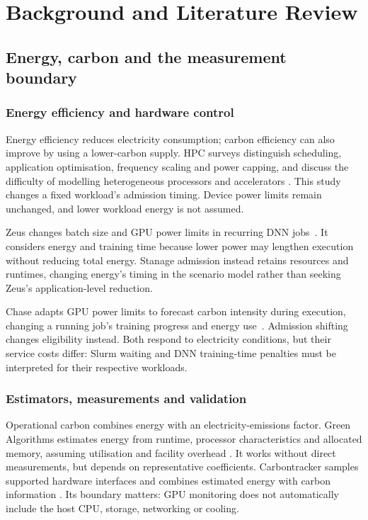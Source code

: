 \chapter{Background and Literature Review}
\label{ch:literature}

\section{Energy, carbon and the measurement boundary}

\subsection{Energy efficiency and hardware control}
Energy efficiency reduces electricity consumption; carbon efficiency can also improve by using a lower-carbon supply. HPC surveys distinguish scheduling, application optimisation, frequency scaling and power capping, and discuss the difficulty of modelling heterogeneous processors and accelerators \citep{czarnul2019energy,obrien2017survey}. This study changes a fixed workload's admission timing. Device power limits remain unchanged, and lower workload energy is not assumed.

Zeus changes batch size and GPU power limits in recurring DNN jobs~\citep{you2023zeus}. It considers energy and training time because lower power may lengthen execution without reducing total energy. Stanage admission instead retains resources and runtimes, changing energy's timing in the scenario model rather than seeking Zeus's application-level reduction.

Chase adapts GPU power limits to forecast carbon intensity during execution, changing a running job's training progress and energy use~\citep{yang2023chase}. Admission shifting changes eligibility instead. Both respond to electricity conditions, but their service costs differ: Slurm waiting and DNN training-time penalties must be interpreted for their respective workloads.

\subsection{Estimators, measurements and validation}
Operational carbon combines energy with an electricity-emissions factor. Green Algorithms estimates energy from runtime, processor characteristics and allocated memory, assuming utilisation and facility overhead \citep{lannelongue2021green}. It works without direct measurements, but depends on representative coefficients. Carbontracker samples supported hardware interfaces and combines estimated energy with carbon information \citep{anthony2020carbontracker}. Its boundary matters: GPU monitoring does not automatically include the host CPU, storage, networking or cooling.

